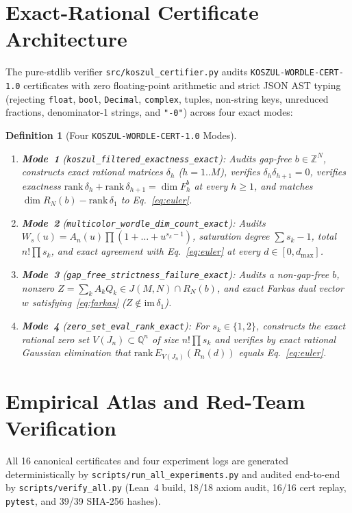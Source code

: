 \documentclass[11pt,twocolumn]{article}
\newtheorem{definition}{Definition}
\newcommand{\ZZ}{\mathbb{Z}}
\newcommand{\QQ}{\mathbb{Q}}
\begin{document}
\section{Exact-Rational Certificate Architecture}\label{sec:certifier}
The pure-stdlib verifier \texttt{src/koszul\_certifier.py} audits \texttt{KOSZUL-WORDLE-CERT-1.0} certificates with zero floating-point arithmetic and strict JSON AST typing (rejecting \texttt{float}, \texttt{bool}, \texttt{Decimal}, \texttt{complex}, tuples, non-string keys, unreduced fractions, denominator-1 strings, and \texttt{"-0"}) across four exact modes:

\begin{definition}[Four \texttt{KOSZUL-WORDLE-CERT-1.0} Modes]\label{def:modes}
\leavevmode
\begin{enumerate}[leftmargin=*,nosep]
  \item \textbf{Mode~1} (\texttt{\small koszul\_\allowbreak filtered\_\allowbreak exactness\_\allowbreak exact}): Audits gap-free $b \in \ZZ^N$, constructs exact rational matrices $\delta_h$ ($h=1..M$), verifies $\delta_h \delta_{h+1} = 0$, verifies exactness $\mathrm{rank}\,\delta_h + \mathrm{rank}\,\delta_{h+1} = \dim F_h^b$ at every $h \ge 1$, and matches $\dim R_N(b) - \mathrm{rank}\,\delta_1$ to Eq.~\eqref{eq:euler}.
  \item \textbf{Mode~2} (\texttt{\small multicolor\_\allowbreak wordle\_\allowbreak dim\_\allowbreak count\_\allowbreak exact}): Audits $W_s(u) = A_n(u)\prod(1+\dots+u^{s_k-1})$, saturation degree $\sum s_k - 1$, total $n!\prod s_k$, and exact agreement with Eq.~\eqref{eq:euler} at every $d \in [0, d_{\max}]$.
  \item \textbf{Mode~3} (\texttt{\small gap\_\allowbreak free\_\allowbreak strictness\_\allowbreak failure\_\allowbreak exact}): Audits a non-gap-free $b$, nonzero $Z = \sum_k A_k Q_k \in J(M,N) \cap R_N(b)$, and exact Farkas dual vector $w$ satisfying~\eqref{eq:farkas} ($Z \notin \mathrm{im}\,\delta_1$).
  \item \textbf{Mode~4} (\texttt{\small zero\_\allowbreak set\_\allowbreak eval\_\allowbreak rank\_\allowbreak exact}): For $s_k \in \{1,2\}$, constructs the exact rational zero set $V(J_n) \subset \QQ^n$ of size $n!\prod s_k$ and verifies by exact rational Gaussian elimination that $\mathrm{rank}\,E_{V(J_n)}(R_n(d))$ equals Eq.~\eqref{eq:euler}.
\end{enumerate}
\end{definition}

\section{Empirical Atlas and Red-Team Verification}\label{sec:results}
All 16 canonical certificates and four experiment logs are generated deterministically by \texttt{scripts/run\_all\_experiments.py} and audited end-to-end by \texttt{scripts/verify\_all.py} (Lean~4 build, 18/18 axiom audit, 16/16 cert replay, \texttt{pytest}, and 39/39 SHA-256 hashes).
\end{document}
